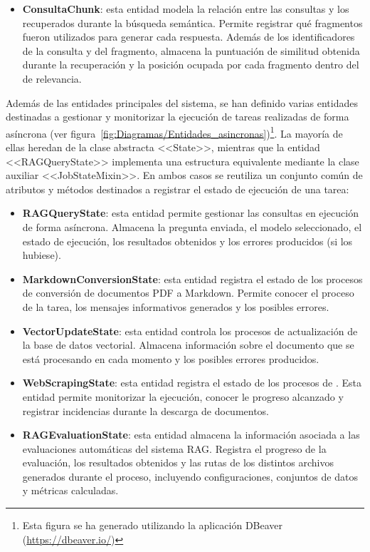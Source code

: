 \begin{itemize}
	\item \textbf{ConsultaChunk}: esta entidad modela la relación entre las consultas y los  recuperados durante la búsqueda semántica. Permite registrar qué fragmentos fueron utilizados para generar cada respuesta. Además de los identificadores de la consulta y del fragmento, almacena la puntuación de similitud obtenida durante la recuperación y la posición ocupada por cada fragmento dentro del  de relevancia.
\end{itemize}


Además de las entidades principales del sistema, se han definido varias entidades destinadas a gestionar y monitorizar la ejecución de tareas realizadas de forma asíncrona (ver figura~\ref{fig:Diagramas/Entidades_asincronas})\footnote{Esta figura se ha generado utilizando la aplicación DBeaver (\href{https://dbeaver.io/}{https://dbeaver.io/})}. La mayoría de ellas heredan de la clase abstracta <<State>>, mientras que la entidad <<RAGQueryState>> implementa una estructura equivalente mediante la clase auxiliar <<JobStateMixin>>. En ambos casos se reutiliza un conjunto común de atributos y métodos destinados a registrar el estado de ejecución de una tarea:

\begin{itemize}
	\item \textbf{RAGQueryState}: esta entidad permite gestionar las consultas en ejecución de forma asíncrona. Almacena la pregunta enviada, el modelo seleccionado,  el estado de ejecución, los resultados obtenidos y los errores producidos (si los hubiese). 
	\item \textbf{MarkdownConversionState}: esta entidad registra el estado de los procesos de conversión de documentos PDF a Markdown. Permite conocer el proceso de la tarea, los mensajes informativos generados y los posibles errores.
	\item \textbf{VectorUpdateState}: esta entidad controla los procesos de actualización de la base de datos vectorial. Almacena información sobre el documento que se está procesando en cada momento y los posibles errores producidos.
	\item \textbf{WebScrapingState}: esta entidad registra el estado de los procesos de . Esta entidad permite monitorizar la ejecución, conocer le progreso alcanzado y registrar incidencias durante la descarga de documentos.
	\item \textbf{RAGEvaluationState}: esta entidad almacena la información asociada a las evaluaciones automáticas del sistema RAG. Registra el progreso de la evaluación, los resultados obtenidos y las rutas de los distintos archivos generados durante el proceso, incluyendo configuraciones, conjuntos de datos y métricas calculadas.
\end{itemize}

